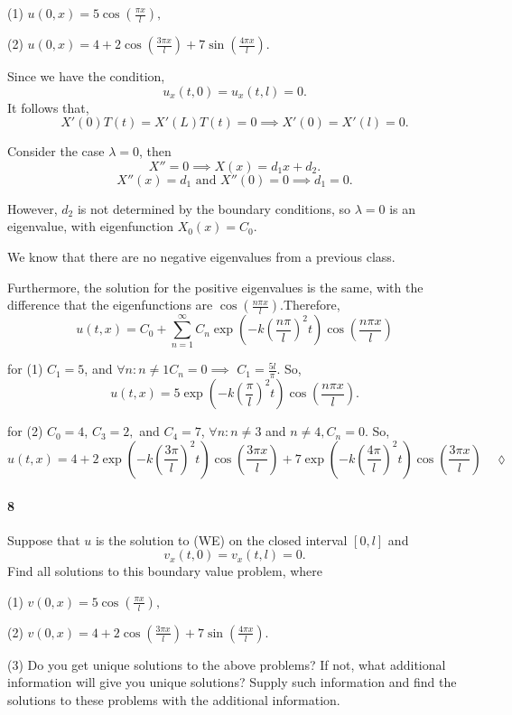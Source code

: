 \documentclass{article}
\begin{document}
(1) $u(0, x) = 5 \cos\left( \frac{\pi x}{l} \right),$

(2) $u(0, x) = 4 + 2\cos\left( \frac{3\pi x}{l} \right) +7 \sin\left( \frac{4\pi x}{l} \right).$


Since we have the condition,
\[u_x(t,0) = u_x(t,l) = 0.\]
It follows that,
\[X'(0)T(t) = X'(L)T(t) = 0 \implies X'(0) = X'(l) =0.\]

Consider the case $\lambda = 0$, then
\[X'' = 0 \implies X(x) = d_1x +d_2.\]
\[X''(x) = d_1 \text{ and }X''(0) = 0 \implies d_1 = 0.\]

However, $d_2$ is not determined by the boundary conditions, so
$\lambda = 0$ is an eigenvalue, with eigenfunction $X_0(x) = C_0.$

We know that there are no negative eigenvalues from a previous class.

Furthermore, the solution for the positive eigenvalues is the same,
with the difference that the eigenfunctions are $\cos(\frac{n\pi x}{l})$.Therefore,
\[u(t,x) = C_0 + \sum_{n=1}^{\infty} C_n\exp\left(-k\left(
      \frac{n\pi}{l}\right)^2t \right)\cos\left( \frac{n\pi x}{l}
  \right)\]

for (1) $C_1 = 5$, and $\forall n: n\neq 1 C_n = 0 \implies$
$C_1 = \frac{5l}{\pi}$. So,
\[u(t,x) = 5\exp\left(-k\left(
      \frac{\pi}{l}\right)^2t \right)\cos\left(\frac{n\pi x}{l}
  \right).\]

for (2) $C_0 = 4$, $C_3 = 2,$ and $C_4 = 7$, $\forall n: n\neq 3$ and
$n\neq 4, C_n = 0$. So,
\[ u(t,x) = 4 + 2\exp\left(-k\left(
      \frac{3\pi}{l}\right)^2t \right)\cos\left( \frac{3\pi x}{l}
  \right) + 7\exp\left(-k\left(
      \frac{4\pi}{l}\right)^2t \right)\cos\left( \frac{3\pi x}{l}
  \right)\quad \lozenge\]

\newpage
\paragraph{8} Suppose that $u$ is the solution to (WE) on the closed interval $[0, l]$ and
\[v_x(t, 0) = v_x(t, l) = 0.\]
Find all solutions to this boundary value problem, where

(1) $v(0, x) = 5 \cos\left( \frac{\pi x}{l} \right),$

(2) $v(0, x) = 4 + 2\cos\left( \frac{3\pi x}{l} \right) +7 \sin\left( \frac{4\pi x}{l} \right).$

(3) Do you get unique solutions to the above problems? If not, what additional information
will give you unique solutions? Supply such information and find the solutions to these
problems with the additional information.
\end{document}
